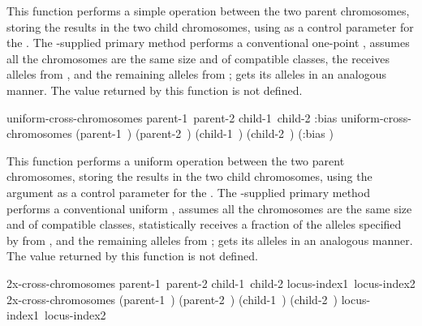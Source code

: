 {{This function performs a simple  operation between the two
parent chromosomes, storing the results in the two child chromosomes, using
 as a control parameter for the . The \geco-supplied
primary method performs a conventional one-point , assumes all the
chromosomes are the same size and of compatible classes, the  receives
 alleles from , and the remaining alleles from
;  gets its alleles in an analogous manner.
The value returned by this function is not defined.
\par}%

\filbreak
{\samepage
\Defgeneric uniform-cross-chromosomes {\hbox{parent-1 parent-2}
                               \hbox{child-1 child-2}
                               \key :bias}
 uniform-cross-chromosomes {\hbox{(parent-1 )}
                              \hbox{(parent-2 )}
                              \hbox{(child-1 )}
                              \hbox{(child-2 )}
                              \key (:bias )}

This function performs a uniform 
\cite{ga:uniform-xover,ga:parameterized-uniform-xover,ga:davis-handbook} operation
between the two parent chromosomes, storing the results in the two child
chromosomes, using the  argument as a control parameter for the
. The \geco-supplied primary method performs a conventional uniform
, assumes all the chromosomes are the same size and of compatible classes,
 statistically receives a fraction of the alleles specified by
 from , and the remaining alleles from ;
 gets its alleles in an analogous manner.
The value returned by this function is not defined.
\par}%

\filbreak
{\samepage
\Defgeneric 2x-cross-chromosomes {\hbox{parent-1 parent-2}
                               \hbox{child-1 child-2}
                               \hbox{locus-index1 locus-index2}}
 2x-cross-chromosomes {\hbox{(parent-1 )}
                              \hbox{(parent-2 )}
                              \hbox{(child-1 )}
                              \hbox{(child-2 )}
                              \hbox{locus-index1 locus-index2}}

}}
